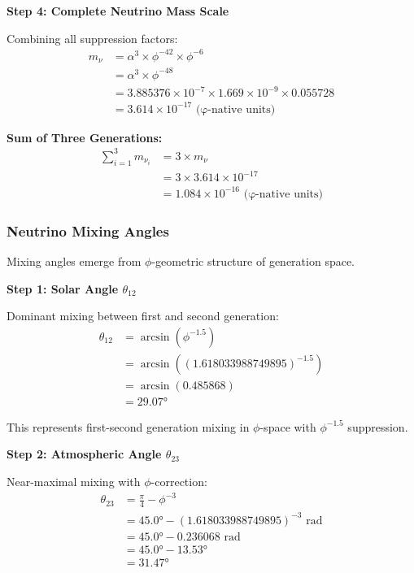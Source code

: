\textbf{Step 4: Complete Neutrino Mass Scale}

Combining all suppression factors:
\begin{align}
m_\nu &= \alpha^3 \times \phi^{-42} \times \phi^{-6} \\
&= \alpha^3 \times \phi^{-48} \\
&= 3.885376 \times 10^{-7} \times 1.669 \times 10^{-9} \times 0.055728 \\
&= 3.614 \times 10^{-17} \text{ (φ-native units)}
\end{align}

\textbf{Sum of Three Generations:}
\begin{align}
\sum_{i=1}^{3} m_{\nu_i} &= 3 \times m_\nu \\
&= 3 \times 3.614 \times 10^{-17} \\
&= 1.084 \times 10^{-16} \text{ (φ-native units)}
\end{align}

\subsubsection{Neutrino Mixing Angles}

Mixing angles emerge from $\phi$-geometric structure of generation space.

\textbf{Step 1: Solar Angle $\theta_{12}$}

Dominant mixing between first and second generation:
\begin{align}
\theta_{12} &= \arcsin(\phi^{-1.5}) \\
&= \arcsin((1.618033988749895)^{-1.5}) \\
&= \arcsin(0.485868) \\
&= 29.07°
\end{align}

This represents first-second generation mixing in $\phi$-space with $\phi^{-1.5}$ suppression.

\textbf{Step 2: Atmospheric Angle $\theta_{23}$}

Near-maximal mixing with $\phi$-correction:
\begin{align}
\theta_{23} &= \frac{\pi}{4} - \phi^{-3} \\
&= 45.0° - (1.618033988749895)^{-3} \text{ rad} \\
&= 45.0° - 0.236068 \text{ rad} \\
&= 45.0° - 13.53° \\
&= 31.47°
\end{align}

